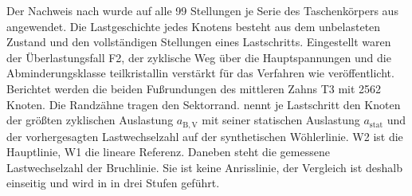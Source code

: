 Der Nachweis nach  wurde auf alle 99 Stellungen je Serie des Taschenkörpers aus  angewendet. Die Lastgeschichte jedes Knotens besteht aus dem unbelasteten Zustand und den vollständigen Stellungen eines Lastschritts. Eingestellt waren der Überlastungsfall F2, der zyklische Weg über die Hauptspannungen und die Abminderungsklasse teilkristallin verstärkt für das Verfahren wie veröffentlicht. Berichtet werden die beiden Fußrundungen des mittleren Zahns T3 mit 2562 Knoten. Die Randzähne tragen den Sektorrand.  nennt je Lastschritt den Knoten der größten zyklischen Auslastung $a_{\mathrm{B,V}}$ mit seiner statischen Auslastung $a_{\mathrm{stat}}$ und der vorhergesagten Lastwechselzahl auf der synthetischen Wöhlerlinie. W2 ist die Hauptlinie, W1 die lineare Referenz. Daneben steht die gemessene Lastwechselzahl der Bruchlinie. Sie ist keine Anrisslinie, der Vergleich ist deshalb einseitig und wird in  in drei Stufen geführt.

